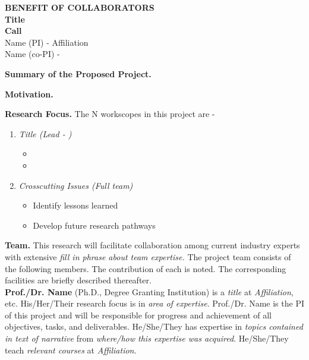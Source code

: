 \documentclass[11pt,letterpaper]{article}
\begin{document}
{\centering 
    \textbf{BENEFIT OF COLLABORATORS\\
    Title\\
    Call\\
    }
    Name (PI) - Affiliation\\
    Name (co-PI) - 
\par
}

\vspace{\baselineskip}

\noindent\textbf{Summary of the Proposed Project.} 

\noindent\textbf{Motivation.} 

\noindent\textbf{Research Focus.} The N workscopes in this project are - 
\begin{enumerate}[topsep=0pt,itemsep=-1ex,partopsep=1ex,parsep=1ex]
    \item\textit{Title (Lead - )}
        \begin{itemize}[topsep=-1ex,itemsep=-1ex,partopsep=1ex,parsep=1ex]
            \item 
            \item 
        \end{itemize}
    \item\textit{Crosscutting Issues (Full team)}
        \begin{itemize}[topsep=-1ex,itemsep=-1ex,partopsep=1ex,parsep=1ex]
            \item Identify lessons learned
            \item Develop future research pathways
        \end{itemize}
\end{enumerate}

\vspace{\baselineskip}

\noindent\textbf{Team.} This research will facilitate collaboration among current industry experts with extensive \textit{fill in phrase about team expertise.} The project team consists of the following members. The contribution of each is noted. The corresponding facilities are briefly described thereafter.
\\

\noindent\textbf{Prof./Dr. Name} (Ph.D., Degree Granting Institution) is a \textit{title} at \textit{Affiliation}, etc. His/Her/Their research focus is in \textit{area of expertise}. Prof./Dr. Name is the PI of this project and will be responsible for progress and achievement of all objectives, tasks, and deliverables. He/She/They has expertise in \textit{topics contained in text of narrative} from \textit{where/how this expertise was acquired}. He/She/They teach \textit{relevant courses} at \textit{Affiliation}.
\\
\end{document}
